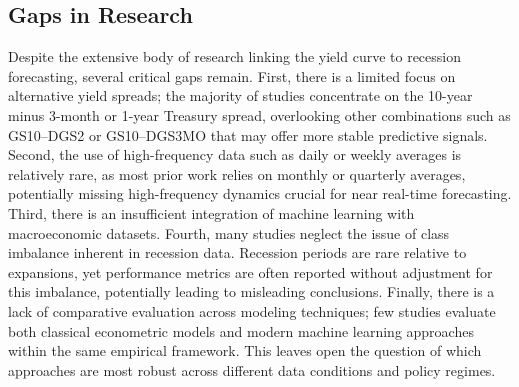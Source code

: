 
\subsection{Gaps in Research}

\begin{comment}
\begin{itemize}
    \item Limited Focus on Alternative Yield Spreads
    \item Underexplored Use of Daily Frequency Data
    \item Insufficient Integration of Machine Learning with Macroeconomic Interpretation
    \item Neglect of Class Imbalance in Recession Prediction
    \item Lack of Comparative Evaluation Across Modeling Techniques
\end{itemize}
\end{comment}



Despite the extensive body of research linking the yield curve to recession forecasting, several critical gaps remain. First, there is a limited focus on alternative yield spreads; the majority of studies concentrate on the 10-year minus 3-month or 1-year Treasury spread,
overlooking other combinations such as GS10–DGS2 or GS10–DGS3MO that may offer %
more stable predictive signals.
Second, the use of high-frequency data such as daily or weekly averages is relatively
rare, as most prior work relies on monthly or quarterly averages, potentially missing high-frequency dynamics crucial for near real-time forecasting.
Third, there is an insufficient integration of machine learning with macroeconomic datasets. %
Fourth, many studies neglect the issue of class imbalance inherent in recession data. Recession periods are rare relative to expansions, yet performance metrics are often reported without adjustment for this imbalance, potentially leading to misleading conclusions.
Finally, there is a lack of comparative evaluation across modeling techniques; few studies evaluate both classical econometric models and modern machine learning approaches within the same empirical framework. This leaves open the question of which approaches are most robust across different data conditions and policy regimes.

